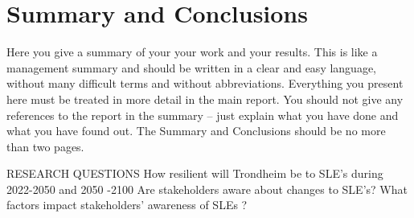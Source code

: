 \section*{Summary and Conclusions}
Here you give a summary of your your work and your results. This is like a management summary and should be written in a clear and easy language, without many difficult terms and without abbreviations. Everything you present here must be treated in more detail in the main report. You should not give any references to the report in the summary -- just explain what you have done and what you have found out. The Summary and Conclusions should be no more than two pages.

RESEARCH QUESTIONS
How resilient will Trondheim be to SLE’s during 2022-2050 and 2050 -2100
Are stakeholders aware about changes to SLE’s?
What factors impact stakeholders’ awareness of SLEs ?
